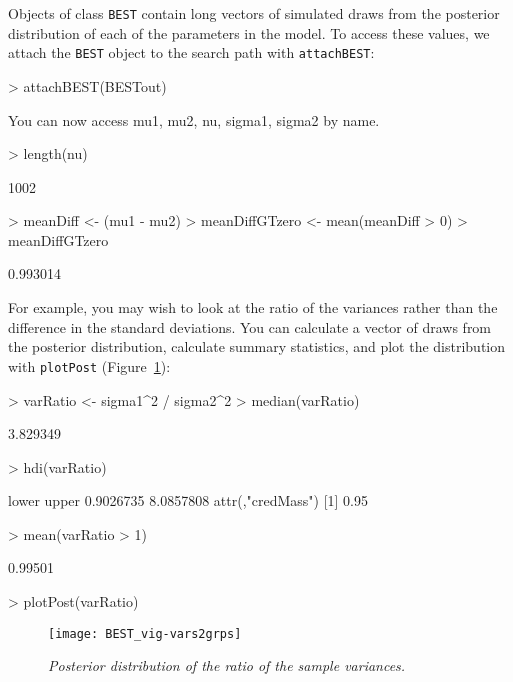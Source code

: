 \documentclass[a4paper]{article}
\begin{document}
Objects of class \texttt{BEST} contain long vectors of simulated draws from the posterior distribution of each of the parameters in the model. To access these values, we attach the \texttt{BEST} object to the search path with \texttt{attachBEST}:
\begin{Schunk}
\begin{Sinput}
> attachBEST(BESTout)
\end{Sinput}
\begin{Soutput}
You can now access mu1, mu2, nu, sigma1, sigma2 by name.
\end{Soutput}
\begin{Sinput}
> length(nu)
\end{Sinput}
\begin{Soutput}
[1] 1002
\end{Soutput}
\begin{Sinput}
> meanDiff <- (mu1 - mu2)
> meanDiffGTzero <- mean(meanDiff > 0)
> meanDiffGTzero
\end{Sinput}
\begin{Soutput}
[1] 0.993014
\end{Soutput}
\end{Schunk}
For example, you may wish to look at the ratio of the variances rather than the difference in the standard deviations. You can calculate a vector of draws from the posterior distribution, calculate summary statistics, and plot the distribution with \texttt{plotPost} (Figure~\ref{fig:vars2g}):
\begin{Schunk}
\begin{Sinput}
> varRatio <- sigma1^2 / sigma2^2
> median(varRatio)
\end{Sinput}
\begin{Soutput}
[1] 3.829349
\end{Soutput}
\begin{Sinput}
> hdi(varRatio)
\end{Sinput}
\begin{Soutput}
    lower     upper 
0.9026735 8.0857808 
attr(,"credMass")
[1] 0.95
\end{Soutput}
\begin{Sinput}
> mean(varRatio > 1)
\end{Sinput}
\begin{Soutput}
[1] 0.99501
\end{Soutput}
\begin{Sinput}
> plotPost(varRatio)
\end{Sinput}
\end{Schunk}
\begin{figure}[H]
  \centering
  \texttt{[image: BEST\_vig-vars2grps]}
  \caption{\it Posterior distribution of the ratio of the sample variances.}
  \label{fig:vars2g}
\end{figure}
\end{document}
